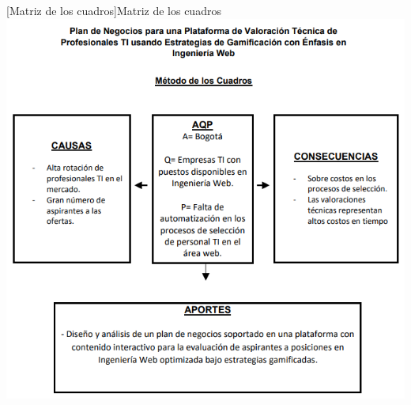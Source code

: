 \vspace{2mm}
        \begin{minipage}{0.9\textwidth}
        \centering
        [{Matriz de los cuadros}]{Matriz de los cuadros }
        \label{cuadros}
         \includegraphics[width=1\textwidth]{Images/matriz de los cuadros.png}
\end{minipage}

